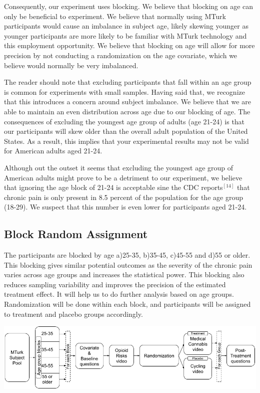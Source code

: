\documentclass[
]{article}
\begin{document}
Consequently, our experiment uses blocking. We believe that blocking on
age can only be beneficial to experiment. We believe that normally using
MTurk participants would cause an imbalance in subject age, likely
skewing younger as younger participants are more likely to be familiar
with MTurk technology and this employment opportunity. We believe that
blocking on age will allow for more precision by not conducting a
randomization on the age covariate, which we believe would normally be
very imbalanced.

The reader should note that excluding participants that fall within an
age group is common for experiments with small samples. Having said
that, we recognize that this introduces a concern around subject
imbalance. We believe that we are able to maintain an even distribution
across age due to our blocking of age. The consequences of excluding the
youngest age group of adults (age 21-24) is that our participants will
skew older than the overall adult population of the United States. As a
result, this implies that your experimental results may not be valid for
American adults aged 21-24.

Although out the outset it seems that excluding the youngest age group
of American adults might prove to be a detriment to our experiment, we
believe that ignoring the age block of 21-24 is acceptable sine the CDC
reports\(^{[14]}\) that chronic pain is only present in 8.5 percent of
the population for the age group (18-29). We suspect that this number is
even lower for participants aged 21-24.

\hypertarget{block-random-assignment}{%
\subsection{Block Random Assignment}\label{block-random-assignment}}

The participants are blocked by age a)25-35, b)35-45, c)45-55 and d)55
or older. This blocking gives similar potential outcomes as the severity
of the chronic pain varies across age groups and increases the
statistical power. This blocking also reduces sampling variability and
improves the precision of the estimated treatment effect. It will help
us to do further analysis based on age groups. Randomization will be
done within each block, and participants will be assigned to treatment
and placebo groups accordingly.

\includegraphics{randomization_chart.png}\\
\hspace*{0.333em}
\end{document}
